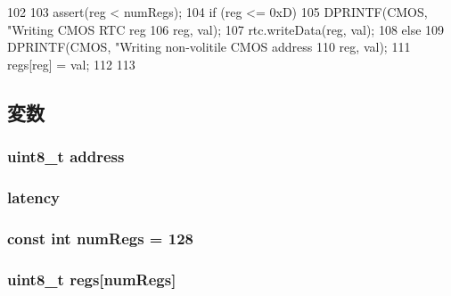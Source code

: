 \begin{DoxyCode}
102 {
103     assert(reg < numRegs);
104     if (reg <= 0xD) {
105         DPRINTF(CMOS, "Writing CMOS RTC reg %
106                 reg, val);
107         rtc.writeData(reg, val);
108     } else {
109         DPRINTF(CMOS, "Writing non-volitile CMOS address %
110                 reg, val);
111         regs[reg] = val;
112     }
113 }
\end{DoxyCode}


\subsection{変数}
\hypertarget{classX86ISA_1_1Cmos_af3f726014b044194def151079f1f2d89}{
\subsubsection[{address}]{\setlength{\rightskip}{0pt plus 5cm}uint8\_\-t {\bf address}}}
\label{classX86ISA_1_1Cmos_af3f726014b044194def151079f1f2d89}
\hypertarget{classX86ISA_1_1Cmos_ac8d8966078cc047949fd1bca8feb21b6}{
\subsubsection[{latency}]{ {\bf latency}}}
\label{classX86ISA_1_1Cmos_ac8d8966078cc047949fd1bca8feb21b6}
\hypertarget{classX86ISA_1_1Cmos_a443de50008cc375e38503522f5f3cf02}{
\subsubsection[{numRegs}]{\setlength{\rightskip}{0pt plus 5cm}const int {\bf numRegs} = 128}}
\label{classX86ISA_1_1Cmos_a443de50008cc375e38503522f5f3cf02}
\hypertarget{classX86ISA_1_1Cmos_a4d417c6dbc62e1223649ce26f948735f}{
\subsubsection[{regs}]{\setlength{\rightskip}{0pt plus 5cm}uint8\_\-t {\bf regs}\mbox{[}{\bf numRegs}\mbox{]}}}
